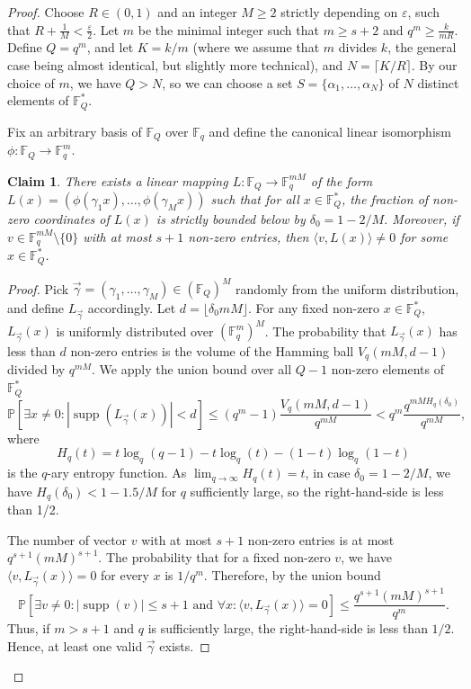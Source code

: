 \documentclass[10pt,a4paper]{amsart}
\newtheorem{claim}{Claim}
\DeclareMathOperator{\supp}{supp}
\begin{document}
\begin{proof}
Choose  $R \in (0, 1)$ and an integer $M \ge 2$ strictly depending on $\varepsilon$, such that $R+ \frac{1}{M}< \frac{\varepsilon}{2}$.
Let $m$ be the minimal integer such that $m \ge s+2$ and $q^m \ge \frac{k}{mR}$. Define $Q = q^m$, and let $K = k/m$ (where we assume that $m$ divides $k$, the general case being almost identical, but slightly more technical), and  $N = \lceil K/R \rceil$. By our choice of $m$, we have $Q>N$, so we can choose a set $S = \{\alpha_1, \dots, \alpha_N\}$  of $N$ distinct elements of $\mathbb{F}_Q^*$.

Fix an arbitrary basis of $\mathbb{F}_Q$ over $\mathbb{F}_q$ and define the canonical linear isomorphism $\phi : \mathbb{F}_Q \rightarrow \mathbb{F}_q^m$.

\begin{claim}
There exists a linear mapping $L : \mathbb{F}_Q \to \mathbb{F}_{q}^{mM}$ of the form $L(x) = \left(\phi(\gamma_1 x), \dots, \phi(\gamma_M x)\right)$ such that for all $x \in \mathbb{F}_Q^*$, the  fraction of non-zero coordinates of $L(x)$ is strictly bounded below by $\delta_{0} = 1 - 2/M$. Moreover, if $v\in \mathbb{F}_q^{mM}\setminus\{0\}$ with at most  $s+1$ non-zero entries, then $\langle v,L(x)\rangle\neq 0$ for some $x\in \mathbb{F}_Q^*$.
\end{claim}
\begin{proof} Pick $\vec{\gamma} = (\gamma_1, \dots, \gamma_M) \in (\mathbb{F}_Q)^M$ randomly from the uniform distribution, and define $L_{\vec{\gamma}}$ accordingly. Let $d = \lfloor \delta_{0} mM \rfloor$. For any fixed non-zero $x \in \mathbb{F}_Q^*$,  $L_{\vec{\gamma}}(x)$ is uniformly distributed over $(\mathbb{F}_q^{m})^M$. The probability that $L_{\vec{\gamma}}(x)$ has less than $d$ non-zero entries is the volume of the Hamming ball $V_q(mM, d-1)$ divided by $q^{mM}$. We apply the union bound over all $Q-1$ non-zero elements of $\mathbb{F}_Q^*$
$$\mathbb{P} \left[ \exists x \neq 0 : |\supp(L_{\vec{\gamma}}(x))|<d\right] \le (q^m - 1) \frac{V_q(mM, d-1)}{q^{mM}} < q^m \frac{q^{mMH_q(\delta_{0})}}{q^{mM}},$$
where $$H_q(t) = t \log_q(q-1) - t \log_q(t) - (1-t) \log_q(1-t)$$ is the $q$-ary entropy function. As $\lim_{q\rightarrow\infty} H_q(t)=t$, in case $\delta_0=1-2/M$, we have $H_q(\delta_0)< 1-1.5/M$ for $q$ sufficiently large, so the right-hand-side is less than 1/2.

The number of vector $v$ with at most $s+1$ non-zero entries is at most $q^{s+1}(mM)^{s+1}$. The probability that for a fixed non-zero $v$, we have $\langle v,L_{\vec{\gamma}}(x)\rangle=0$ for every $x$ is $1/q^m$. Therefore, by the union bound
$$\mathbb{P} \left[ \exists v \neq 0 : |\supp(v)|\leq s+1\text{ and }\forall x: \langle v,L_{\vec{\gamma}}(x)\rangle=0\right] \le \frac{q^{s+1}(mM)^{s+1}}{q^m}.$$
Thus, if $m>s+1$ and $q$ is sufficiently large, the right-hand-side is less than $1/2$.
Hence, at least one valid  $\vec{\gamma}$ exists.
\end{proof}


\end{proof}
\end{document}

